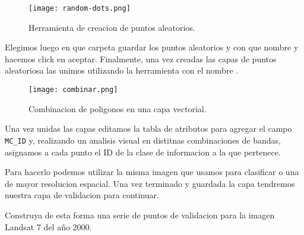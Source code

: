 \begin{exa}
  \begin{figure}[h!]
    \centering
    \texttt{[image: random-dots.png]}
    \caption{Herramienta de creacion de puntos aleatorios.}
    \label{fig:dots}
  \end{figure}

  Elegimos luego en que carpeta guardar los puntos aleatorios y con que nombre y hacemos click en aceptar. Finalmente, una vez creadas las capas de puntos aleatoriosa las unimos utilizando la herramienta  con el nombre .

  \begin{figure}[h!]
    \centering
    \texttt{[image: combinar.png]}
    \caption{Combinacion de poligonos en una capa vectorial.}
    \label{}
  \end{figure}

  Una vez unidas las capas editamos la tabla de atributos para agregar el campo
  \verb|MC_ID| y, realizando un analisis visual en distitnas combinaciones de bandas,
  asignamos a cada punto el ID de la clase de informacion a la que pertenece.

  Para hacerlo podemos utilizar la misma imagen que usamos para clasificar o una
  de mayor resolucion espacial. Una vez terminado y guardada la capa tendremos nuestra capa
  de validacion para continuar.

\end{exa}

\begin{act}
  Construya de esta forma una serie de puntos de validacion para la imagen Landsat
  7 del a\~no 2000.
\end{act}

